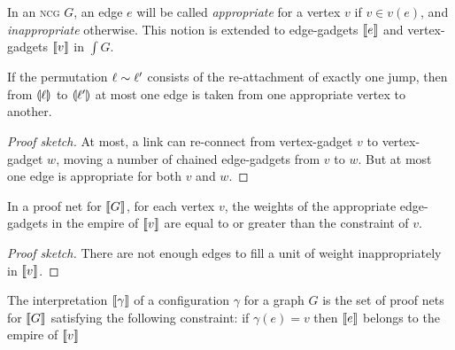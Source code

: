 In an \textsc{ncg} $G$, an edge $e$ will be called \emph{appropriate} for a vertex $v$ if $v\in v(e)$, and \emph{inappropriate} otherwise.
%
This notion is extended to edge-gadgets $\llbracket e\rrbracket$ and vertex-gadgets $\llbracket v\rrbracket$ in $\int G$.


\begin{lemma}
If the permutation $\ell\sim\ell'$ consists of the re-attachment of exactly one jump, then from $\llparenthesis\ell\rrparenthesis$ to $\llparenthesis\ell'\rrparenthesis$ at most one edge is taken from one appropriate vertex to another.
\end{lemma}

\begin{proof}[Proof sketch]
At most, a link can re-connect from vertex-gadget $v$ to vertex-gadget $w$, moving a number of chained edge-gadgets from $v$ to $w$.
%
But at most one edge is appropriate for both $v$ and $w$.
\end{proof}




\begin{lemma}
In a proof net for $\llbracket G\rrbracket$, for each vertex $v$, the weights of the appropriate edge-gadgets in the empire of $\llbracket v\rrbracket$ are equal to or greater than the constraint of $v$.
\end{lemma}



\begin{proof}[Proof sketch]
There are not enough edges to fill a unit of weight inappropriately in $\llbracket v\rrbracket$.
\end{proof}








\begin{definition}
The interpretation $\llbracket\gamma\rrbracket$ of a configuration $\gamma$ for a graph $G$ is the set of proof nets for $\llbracket G\rrbracket$ satisfying the following constraint: if $\gamma(e)=v$ then $\llbracket e\rrbracket$ belongs to the empire of $\llbracket v\rrbracket$
\end{definition}








